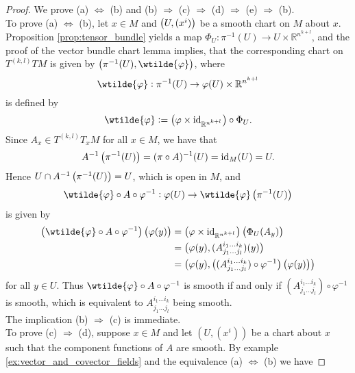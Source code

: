 \begin{proof}
We prove (a) $\Leftrightarrow$ (b) and (b) $\Rightarrow$ (c) $\Rightarrow$ (d) $\Rightarrow$ (e) $\Rightarrow$ (b).\\
To prove (a) $\Leftrightarrow$ (b), let $x \in M$ and $\del[1]{U,(x^i)}$ be a smooth chart on $M$ about $x$. Proposition \ref{prop:tensor_bundle} yields a map $\Phi_U : \pi^{-1}(U) \to U \times \mathbb{R}^{n^{k + l}}$, and the proof of the vector bundle chart lemma implies, that the corresponding chart on $T^{(k,l)}TM$ is given by $\del[1]{\pi^{-1}(U),\wtilde{\varphi}}$, where 
\begin{equation*}
	\wtilde{\varphi}: \pi^{-1}(U) \to \varphi(U) \times \mathbb{R}^{n^{k+l}}
\end{equation*}
\noindent is defined by
\begin{equation*}
	\wtilde{\varphi} := \del[1]{\varphi \times \id_{\mathbb{R}^{n^{k+l}}}} \circ \Phi_U.
\end{equation*}
Since $A_x \in T^{(k,l)}T_xM$ for all $x \in M$, we have that 
\begin{equation*}
A^{-1}\del[1]{\pi^{-1}(U)} = (\pi \circ A)^{-1}(U) = \id_M(U) = U.
\end{equation*}
Hence $U \cap A^{-1}\del[1]{\pi^{-1}(U)} = U$, which is open in $M$, and 
\begin{equation*}
	\wtilde{\varphi} \circ A \circ \varphi^{-1} : \varphi(U) \to \wtilde{\varphi}\del[1]{\pi^{-1}(U)} 
\end{equation*}
\noindent is given by
\begin{align*}
	\del[1]{\wtilde{\varphi} \circ A \circ \varphi^{-1}}\del[1]{\varphi(y)} &= \del[1]{\varphi \times \id_{\mathbb{R}^{n^{k+l}}}}\del[1]{\Phi_U(A_y)}\\
	&= \del[1]{\varphi(y),(A^{i_1\dots i_k}_{j_1\dots j_l})(y)}\\
	&= \del[1]{\varphi(y),\del[1]{(A^{i_1\dots i_k}_{j_1\dots j_l}) \circ {\varphi^{-1}}}\del[1]{\varphi(y)}}
\end{align*}
\noindent for all $y \in U$. Thus $\wtilde{\varphi} \circ A \circ \varphi^{-1}$ is smooth if and only if $(A^{i_1\dots i_k}_{j_1\dots j_l}) \circ {\varphi^{-1}}$ is smooth, which is equivalent to $A^{i_1\dots i_k}_{j_1\dots j_l}$ being smooth.\\
The implication (b) $\Rightarrow$ (c) is immediate.\\
To prove (c) $\Rightarrow$ (d), suppose $x \in M$ and let $(U,(x^i))$ be a chart about $x$ such that the component functions of $A$ are smooth. By example \ref{ex:vector_and_covector_fields} and the equivalence (a) $\Leftrightarrow$ (b) we have

\end{proof}
